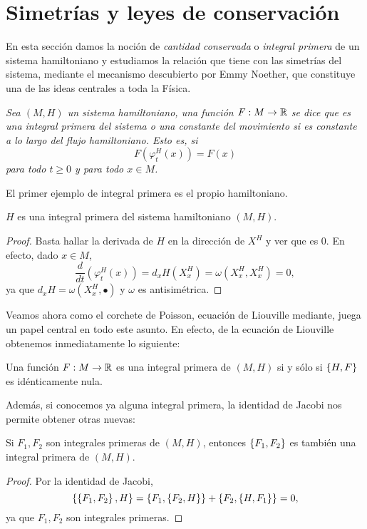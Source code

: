 \section{Simetrías y leyes de conservación}
En esta sección damos la noción de \emph{cantidad conservada} o \emph{integral primera} de un sistema hamiltoniano y estudiamos la relación que tiene con las simetrías del sistema, mediante el mecanismo descubierto por Emmy Noether, que constituye una de las ideas centrales a toda la Física.
\begin{defn}
  \em
  Sea $(M,H)$ un sistema hamiltoniano, una función $F:M \rightarrow \mathbb{R}$ se dice que es una \emph{integral primera} del sistema o una \emph{constante del movimiento} si es constante a lo largo del flujo hamiltoniano. Esto es, si
  \begin{equation*}
    F(\varphi^H_t(x))=F(x)
  \end{equation*}
  para todo $t \geq 0$ y para todo $x \in M$.
\end{defn}

El primer ejemplo de integral primera es el propio hamiltoniano.
  \begin{prop}
    $H$ es una integral primera del sistema hamiltoniano $(M,H)$.
  \end{prop}
  \begin{proof}
    Basta hallar la derivada de $H$ en la dirección de $X^H$ y ver que es 0. En efecto, dado $x \in M$,
    \begin{equation*}
      \frac{d}{dt}\left( \varphi_t^H(x) \right)=d_xH(X_x^H) = \omega(X_x^H,X_x^H)=0,
    \end{equation*}
    ya que $d_xH=\omega(X_x^H,\bullet)$ y $\omega$ es antisimétrica.
  \end{proof}

Veamos ahora como el corchete de Poisson, ecuación de Liouville mediante, juega un papel central en todo este asunto. En efecto, de la ecuación de Liouville obtenemos inmediatamente lo siguiente:
\begin{prop}
    Una función $F:M \rightarrow \mathbb{R}$ es una integral primera de $(M,H)$ si y sólo si $\left\lbrace H,F\right\rbrace$ es idénticamente nula.
\end{prop}

Además, si conocemos ya alguna integral primera, la identidad de Jacobi nos permite obtener otras nuevas:
\begin{prop}
  Si $F_1, F_2$ son integrales primeras de $(M,H)$, entonces $\left\lbrace F_1,F_2\right\rbrace$ es también una integral primera de $(M,H)$.
\end{prop}
\begin{proof}
  Por la identidad de Jacobi,
  \begin{equation*}
    \left\lbrace \left\lbrace F_1,F_2\right\rbrace, H\right\rbrace= \left\lbrace F_1, \left\lbrace F_2,H\right\rbrace\right\rbrace + \left\lbrace F_2, \left\lbrace H,F_1\right\rbrace \right\rbrace=0,
  \end{equation*}
  ya que $F_1,F_2$ son integrales primeras.
\end{proof}

